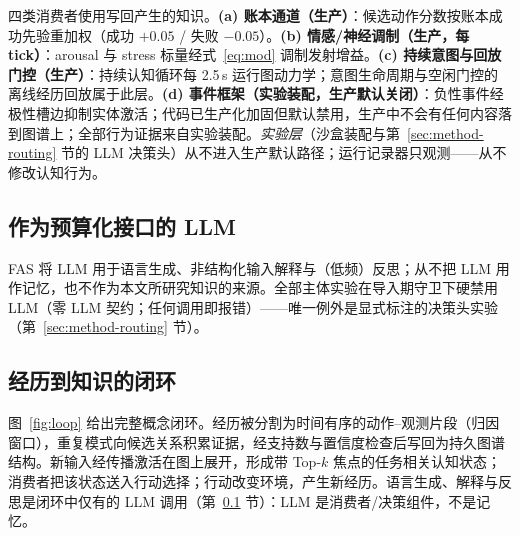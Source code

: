 \documentclass[10pt,a4paper]{ctexart}
\begin{document}
四类消费者使用写回产生的知识。\textbf{(a) 账本通道（生产）}：候选动作分数按账本成功先验重加权（成功 $+0.05$ / 失败 $-0.05$）。\textbf{(b) 情感/神经调制（生产，每 tick）}：arousal 与 stress 标量经式~\ref{eq:mod} 调制发射增益。\textbf{(c) 持续意图与回放门控（生产）}：持续认知循环每 2.5\,s 运行图动力学；意图生命周期与空闲门控的离线经历回放属于此层。\textbf{(d) 事件框架（实验装配，生产默认关闭）}：负性事件经极性槽边抑制实体激活；代码已生产化加固但默认禁用，生产中不会有任何内容落到图谱上；全部行为证据来自实验装配。\emph{实验层}（沙盒装配与第~\ref{sec:method-routing} 节的 LLM 决策头）从不进入生产默认路径；运行记录器只观测——从不修改认知行为。

\subsection{作为预算化接口的 LLM}
\label{sec:arch-llm}
FAS 将 LLM 用于语言生成、非结构化输入解释与（低频）反思；从不把 LLM 用作记忆，也不作为本文所研究知识的来源。全部主体实验在导入期守卫下硬禁用 LLM（零 LLM 契约；任何调用即报错）——唯一例外是显式标注的决策头实验（第~\ref{sec:method-routing} 节）。

\subsection{经历到知识的闭环}
\label{sec:arch-loop}
图~\ref{fig:loop} 给出完整概念闭环。经历被分割为时间有序的动作--观测片段（归因窗口），重复模式向候选关系积累证据，经支持数与置信度检查后写回为持久图谱结构。新输入经传播激活在图上展开，形成带 Top-$k$ 焦点的任务相关认知状态；消费者把该状态送入行动选择；行动改变环境，产生新经历。语言生成、解释与反思是闭环中仅有的 LLM 调用（第~\ref{sec:arch-llm} 节）：LLM 是消费者/决策组件，不是记忆。
\end{document}
